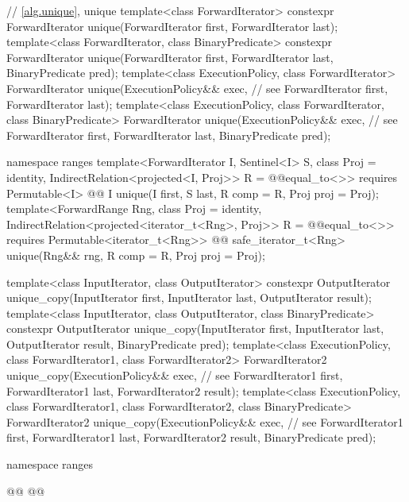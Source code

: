 \begin{codeblock}
  // \ref{alg.unique}, unique
  template<class ForwardIterator>
    constexpr ForwardIterator unique(ForwardIterator first, ForwardIterator last);
  template<class ForwardIterator, class BinaryPredicate>
    constexpr ForwardIterator unique(ForwardIterator first, ForwardIterator last,
                                     BinaryPredicate pred);
  template<class ExecutionPolicy, class ForwardIterator>
    ForwardIterator unique(ExecutionPolicy&& exec, // see 
                           ForwardIterator first, ForwardIterator last);
  template<class ExecutionPolicy, class ForwardIterator, class BinaryPredicate>
    ForwardIterator unique(ExecutionPolicy&& exec, // see 
                           ForwardIterator first, ForwardIterator last,
                           BinaryPredicate pred);
\end{codeblock}\begin{addedblock}\begin{codeblock}
  namespace ranges {
    template<ForwardIterator I, Sentinel<I> S, class Proj = identity,
        IndirectRelation<projected<I, Proj>> R = @@equal_to<>>
      requires Permutable<I>
      @@ I unique(I first, S last, R comp = R{}, Proj proj = Proj{});
    template<ForwardRange Rng, class Proj = identity,
        IndirectRelation<projected<iterator_t<Rng>, Proj>> R = @@equal_to<>>
      requires Permutable<iterator_t<Rng>>
      @@ safe_iterator_t<Rng>
        unique(Rng&& rng, R comp = R{}, Proj proj = Proj{});
  }
\end{codeblock}\end{addedblock}\begin{codeblock}
  template<class InputIterator, class OutputIterator>
    constexpr OutputIterator
      unique_copy(InputIterator first, InputIterator last,
                  OutputIterator result);
  template<class InputIterator, class OutputIterator, class BinaryPredicate>
    constexpr OutputIterator
      unique_copy(InputIterator first, InputIterator last,
                  OutputIterator result, BinaryPredicate pred);
  template<class ExecutionPolicy, class ForwardIterator1, class ForwardIterator2>
    ForwardIterator2
      unique_copy(ExecutionPolicy&& exec, // see 
                  ForwardIterator1 first, ForwardIterator1 last,
                  ForwardIterator2 result);
  template<class ExecutionPolicy, class ForwardIterator1, class ForwardIterator2,
           class BinaryPredicate>
    ForwardIterator2
      unique_copy(ExecutionPolicy&& exec, // see 
                  ForwardIterator1 first, ForwardIterator1 last,
                  ForwardIterator2 result, BinaryPredicate pred);
\end{codeblock}\begin{addedblock}\begin{codeblock}
  namespace ranges {
    @@
    @@

}
\end{codeblock}
\end{addedblock}
